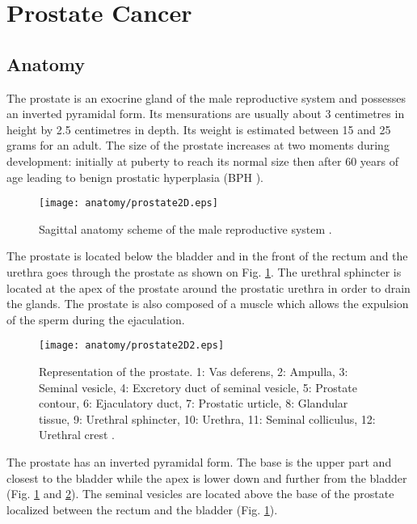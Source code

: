 \section{Prostate Cancer}\label{section:intro:prostatecancer}

\subsection{Anatomy}\label{subsection:intro:prostatecancer:anatomy}

The prostate is an exocrine gland of the male reproductive system and possesses an inverted pyramidal form. Its mensurations are usually about 3 centimetres in height by 2.5 centimetres in depth. Its weight is estimated between 15 and 25 grams for an adult. The size of the prostate increases at two moments during development: initially at puberty to reach its normal size then after 60 years of age leading to benign prostatic hyperplasia (BPH \g).

\begin{figure}
	\centering
	\texttt{[image: anatomy/prostate2D.eps]}
	\caption{Sagittal anatomy scheme of the male reproductive system \cite{Geckomedia2011}.}
	\label{fig:intro:prostatecancer:anatomy:anatomyProstate2D}
\end{figure}

The prostate is located below the bladder and in the front of the rectum and the urethra goes through the prostate as shown on Fig. \ref{fig:intro:prostatecancer:anatomy:anatomyProstate2D}. The urethral sphincter is located at the apex of the prostate around the prostatic urethra in order to drain the glands. The prostate is also composed of a muscle which allows the expulsion of the sperm during the ejaculation.

\begin{figure}
	\centering
	\texttt{[image: anatomy/prostate2D2.eps]}
	\caption{Representation of the prostate. 1: Vas deferens, 2: Ampulla, 3: Seminal vesicle, 4: Excretory duct of seminal vesicle, 5: Prostate contour, 6: Ejaculatory duct, 7: Prostatic urticle, 8: Glandular tissue, 9: Urethral sphincter, 10: Urethra, 11: Seminal colliculus, 12: Urethral crest \cite{Wikipedia2011}.}
	\label{fig:intro:prostatecancer:anatomy:anatomyProstate2D2}
\end{figure}

The prostate has an inverted pyramidal form. The base is the upper part and closest to the bladder while the apex is lower down and further from the bladder (Fig. \ref{fig:intro:prostatecancer:anatomy:anatomyProstate2D} and \ref{fig:intro:prostatecancer:anatomy:anatomyProstate2D2}). The seminal vesicles are located above the base of the prostate localized between the rectum and the bladder (Fig. \ref{fig:intro:prostatecancer:anatomy:anatomyProstate2D}).

